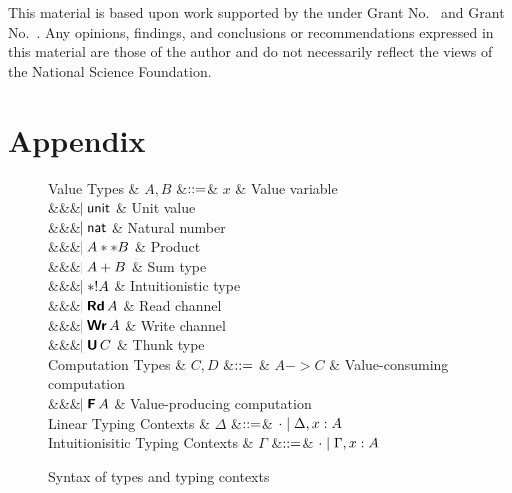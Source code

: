 \documentclass[acmsmall,review,anonymous]{acmart}\settopmatter{printfolios=true,printccs=false,printacmref=false}
\begin{document}
\begin{acks}                            %
  This material is based upon work supported by the
   under Grant
  No.~ and Grant
  No.~.  Any opinions, findings, and
  conclusions or recommendations expressed in this material are those
  of the author and do not necessarily reflect the views of the
  National Science Foundation.
\end{acks}





\appendix
\section{Appendix}

\begin{figure}[htbp]
  \centering

\begin{grammar}
  Value Types
  & $A,B$
      &$\mathrel{::=}$&
      $x$ & Value variable
      \\ &&& $\hspace{-1.02ex}\mathrel{\mid} \mathsf{unit}$ & Unit value
      \\ &&& $\hspace{-1.02ex}\mathrel{\mid} \mathsf{nat}$         & Natural number
      \\ &&& $\hspace{-1.02ex}\mathrel{\mid} A ** B$ & Product
      \\ &&& $\hspace{-1.02ex}\mathrel{\mid} A + B$ & Sum type
      \\ &&& $\hspace{-1.02ex}\mathrel{\mid} *! A$ & Intuitionistic type
      \\ &&& $\bnfaltbrk \tyRd{A}$ & Read channel
      \\ &&& $\bnfaltbrk \tyWr{A}$ & Write channel
      \\ &&& $\bnfaltbrk \tyU{C}$ & Thunk type
  \\[1ex]
  Computation Types
  & $C, D$
      &$\mathrel{::=}$ & 
             $A -> C$ & Value-consuming computation
      \\ &&& $\bnfaltbrk \tyF{A}$ & Value-producing computation
  \\[1ex]
  Linear Typing Contexts
  & $\Delta$
     &$\mathrel{::=}$& $\cdot \mathrel{\mid} \Delta,x:A$
  \\
  Intuitionisitic Typing Contexts
  & $\Gamma$
     &$\mathrel{::=}$& $\cdot \mathrel{\mid} \Gamma,x:A$
\end{grammar}

  \caption{Syntax of types and typing contexts}
  \label{fig:expr}
\end{figure}
\end{document}
